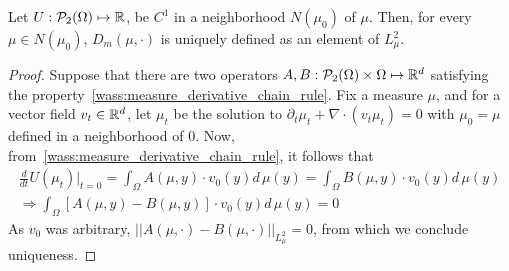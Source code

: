 \begin{proposition}
    Let $U : \mathcal{P}_2(\Omega) \mapsto \mathbb{R}$,
    be $C^1$ in a neighborhood $N(\mu_0)$ of $\mu$.
    Then, for every $\mu \in N(\mu_0)$, $D_m(\mu,\cdot)$ is uniquely defined
    as an element of $L^2_\mu$.
\end{proposition}
\begin{proof}
    Suppose that there are two operators 
    $A, B: \mathcal{P}_2(\Omega) \times \Omega \mapsto \mathbb{R}^d$
    satisfying the property~\eqref{wass:measure_derivative_chain_rule}.
    Fix a measure $\mu$, and for a vector field 
    $v_t \in \mathbb{R}^d$,
    let $\mu_t$ be the solution to $\partial_t \mu_t + \nabla \cdot(v_t \mu_t) = 0$
    with $\mu_0 = \mu$ defined in a neighborhood of $0$.
    Now, from~\eqref{wass:measure_derivative_chain_rule}, it follows that
    \begin{align*}
    \frac{d}{dt} U(\mu_t) |_{t = 0} = \int_\Omega A(\mu, y) \cdot v_0(y) d\, \mu(y) = \int_\Omega B(\mu, y) \cdot v_0(y) d\, \mu(y)\\
    \Rightarrow \int_\Omega [A(\mu, y) - B(\mu, y)]  \cdot v_0(y) d\, \mu(y) = 0
    \end{align*}
    As $v_0$ was arbitrary, $||A(\mu, \cdot) - B(\mu, \cdot)||_{L^2_\mu} = 0$, from which we conclude 
    uniqueness.
\end{proof}